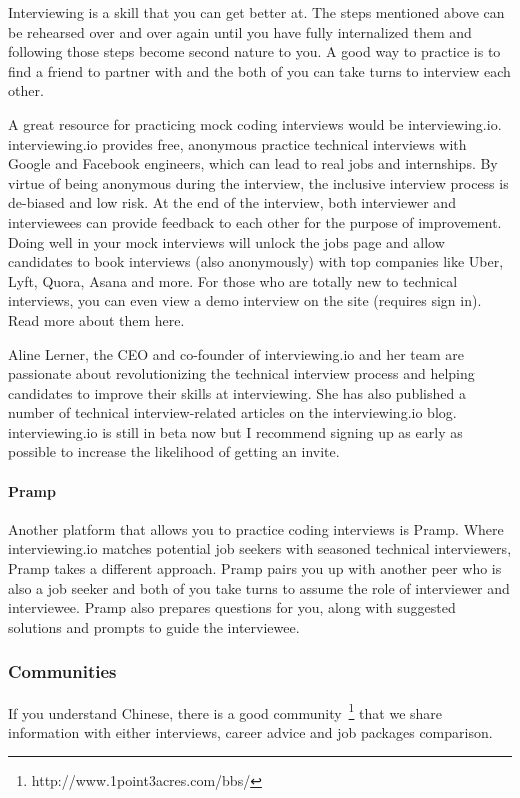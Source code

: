 \documentclass[../main.tex]{subfiles}
\begin{document}
Interviewing is a skill that you can get better at. The steps mentioned above can be rehearsed over and over again until you have fully internalized them and following those steps become second nature to you. A good way to practice is to find a friend to partner with and the both of you can take turns to interview each other.

A great resource for practicing mock coding interviews would be interviewing.io. interviewing.io provides free, anonymous practice technical interviews with Google and Facebook engineers, which can lead to real jobs and internships. By virtue of being anonymous during the interview, the inclusive interview process is de-biased and low risk. At the end of the interview, both interviewer and interviewees can provide feedback to each other for the purpose of improvement. Doing well in your mock interviews will unlock the jobs page and allow candidates to book interviews (also anonymously) with top companies like Uber, Lyft, Quora, Asana and more. For those who are totally new to technical interviews, you can even view a demo interview on the site (requires sign in). Read more about them here.

Aline Lerner, the CEO and co-founder of interviewing.io and her team are passionate about revolutionizing the technical interview process and helping candidates to improve their skills at interviewing. She has also published a number of technical interview-related articles on the interviewing.io blog. interviewing.io is still in beta now but I recommend signing up as early as possible to increase the likelihood of getting an invite.

\paragraph{Pramp} Another platform that allows you to practice coding interviews is Pramp. Where interviewing.io matches potential job seekers with seasoned technical interviewers, Pramp takes a different approach. Pramp pairs you up with another peer who is also a job seeker and both of you take turns to assume the role of interviewer and interviewee. Pramp also prepares questions for you, along with suggested solutions and prompts to guide the interviewee.

\subsubsection{Communities}
If you understand Chinese, there is a good community~\footnote{http://www.1point3acres.com/bbs/} that we share information with either interviews, career advice and job packages comparison. 
\end{document}
